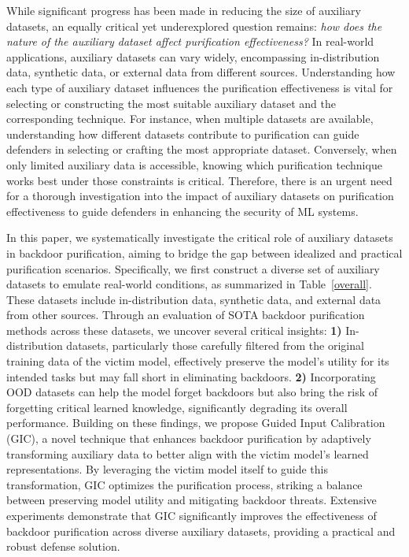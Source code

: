 While significant progress has been made in reducing the size of auxiliary datasets, an equally critical yet underexplored question remains: \emph{how does the nature of the auxiliary dataset affect purification effectiveness?} In  real-world  applications, auxiliary datasets can vary widely, encompassing in-distribution data, synthetic data, or external data from different sources. Understanding how each type of auxiliary dataset influences the purification effectiveness is vital for selecting or constructing the most suitable auxiliary dataset and the corresponding technique. For instance, when multiple datasets are available, understanding how different datasets contribute to purification can guide defenders in selecting or crafting the most appropriate dataset. Conversely, when only limited auxiliary data is accessible, knowing which purification technique works best under those constraints is critical. Therefore, there is an urgent need for a thorough investigation into the impact of auxiliary datasets on purification effectiveness to guide defenders in  enhancing the security of ML systems. 

In this paper, we systematically investigate the critical role of auxiliary datasets in backdoor purification, aiming to bridge the gap between idealized and practical purification scenarios.  Specifically, we first construct a diverse set of auxiliary datasets to emulate real-world conditions, as summarized in Table~\ref{overall}. These datasets include in-distribution data, synthetic data, and external data from other sources. Through an evaluation of SOTA backdoor purification methods across these datasets, we uncover several critical insights: \textbf{1)} In-distribution datasets, particularly those carefully filtered from the original training data of the victim model, effectively preserve the model’s utility for its intended tasks but may fall short in eliminating backdoors. \textbf{2)} Incorporating OOD datasets can help the model forget backdoors but also bring the risk of forgetting critical learned knowledge, significantly degrading its overall performance. Building on these findings, we propose Guided Input Calibration (GIC), a novel technique that enhances backdoor purification by adaptively transforming auxiliary data to better align with the victim model’s learned representations. By leveraging the victim model itself to guide this transformation, GIC optimizes the purification process, striking a balance between preserving model utility and mitigating backdoor threats. Extensive experiments demonstrate that GIC significantly improves the effectiveness of backdoor purification across diverse auxiliary datasets, providing a practical and robust defense solution.

